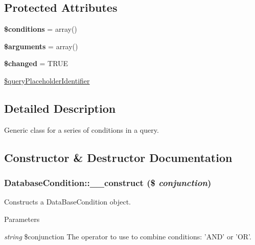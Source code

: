 \subsection*{Protected Attributes}
\begin{DoxyCompactItemize}
\item 
\hypertarget{classDatabaseCondition_adfeee786f36c04ab6872755932bfeec5}{
{\bfseries \$conditions} = array()}
\label{classDatabaseCondition_adfeee786f36c04ab6872755932bfeec5}

\item 
\hypertarget{classDatabaseCondition_ae233af91e5b9fbb483439bfd97a03c71}{
{\bfseries \$arguments} = array()}
\label{classDatabaseCondition_ae233af91e5b9fbb483439bfd97a03c71}

\item 
\hypertarget{classDatabaseCondition_a55b7976ace5a04d766941ebd08793cab}{
{\bfseries \$changed} = TRUE}
\label{classDatabaseCondition_a55b7976ace5a04d766941ebd08793cab}

\item 
\hyperlink{classDatabaseCondition_a282f36ef640252385cb9e1d7872151b1}{\$queryPlaceholderIdentifier}
\end{DoxyCompactItemize}


\subsection{Detailed Description}
Generic class for a series of conditions in a query. 

\subsection{Constructor \& Destructor Documentation}
\hypertarget{classDatabaseCondition_aa5312271d36dcf3d3719cc44563a1056}{
\subsubsection[{\_\-\_\-construct}]{\setlength{\rightskip}{0pt plus 5cm}DatabaseCondition::\_\-\_\-construct (\$ {\em conjunction})}}
\label{classDatabaseCondition_aa5312271d36dcf3d3719cc44563a1056}
Constructs a DataBaseCondition object.


\begin{DoxyParams}{Parameters}
\item[{\em string}]\$conjunction The operator to use to combine conditions: 'AND' or 'OR'. \end{DoxyParams}


